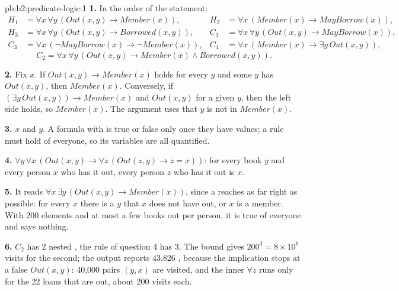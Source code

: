 \begin{solution}{pb:b2:predicate-logic:1}
\textbf{1.} In the order of the statement:
\begin{align*}
H_1 &= \forall x\, \forall y\, (\mathit{Out}(x, y) \to \mathit{Member}(x)), &
H_2 &= \forall x\, (\mathit{Member}(x) \to \mathit{MayBorrow}(x)),\\
H_3 &= \forall x\, \forall y\, (\mathit{Out}(x, y) \to \mathit{Borrowed}(x, y)), &
C_1 &= \forall x\, \forall y\, (\mathit{Out}(x, y) \to \mathit{MayBorrow}(x)),\\
C_3 &= \forall x\, (\neg\mathit{MayBorrow}(x) \to \neg\mathit{Member}(x)), &
C_4 &= \forall x\, (\mathit{Member}(x) \to \exists y\, \mathit{Out}(x, y)),
\end{align*}
\[
C_2 = \forall x\, \forall y\, (\mathit{Out}(x, y) \to \mathit{Member}(x) \wedge \mathit{Borrowed}(x, y)).
\]

\textbf{2.} Fix $x$. If $\mathit{Out}(x, y) \to \mathit{Member}(x)$ holds for every $y$ and some $y$ has
$\mathit{Out}(x, y)$, then $\mathit{Member}(x)$. Conversely, if $(\exists y\, \mathit{Out}(x, y)) \to
\mathit{Member}(x)$ and $\mathit{Out}(x, y)$ for a given $y$, then the left side holds, so $\mathit{Member}(x)$. The
argument uses that $y$ is not  in $\mathit{Member}(x)$.

\textbf{3.} $x$ and $y$. A formula with  is true or false only once they have values; a rule must hold of
everyone, so its variables are all quantified.

\textbf{4.} $\forall y\, \forall x\, (\mathit{Out}(x, y) \to \forall z\, (\mathit{Out}(z, y) \to z = x))$: for every
book $y$ and every person $x$ who has it out, every person $z$ who has it out is $x$.

\textbf{5.} It reads $\forall x\, \exists y\, (\mathit{Out}(x, y) \to \mathit{Member}(x))$, since a  reaches as
far right as possible: for every $x$ there is a $y$ that $x$ does not have out, or $x$ is a member. With 200 elements
and at most a few books out per person, it is true of everyone and says nothing.

\textbf{6.} $C_2$ has 2 nested , the rule of question 4 has 3. The bound gives $200^3 = 8 \times 10^6$ visits
for the second; the output reports 43,826 , because the implication stops at a false
$\mathit{Out}(x, y)$: 40,000 pairs $(y, x)$ are visited, and the inner $\forall z$ runs only for the 22 loans that are
out, about 200 visits each.


\end{solution}
